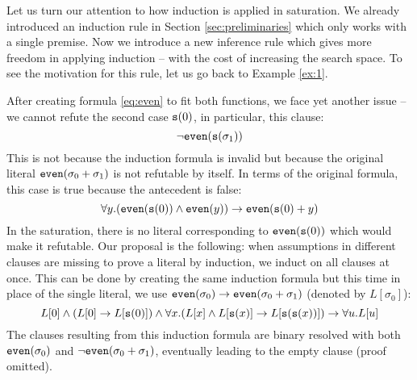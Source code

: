 
Let us turn our attention to how induction is applied in saturation. We already introduced an induction rule in Section \ref{sec:preliminaries} which only works with a single premise. Now we introduce a new inference rule which gives more freedom in applying induction -- with the cost of increasing the search space. To see the motivation for this rule, let us go back to Example \ref{ex:1}.

After creating formula \eqref{eq:even} to fit both functions, we face yet another issue -- we cannot refute the second case $\mathtt{s}(0)$, in particular, this clause:
$$\neg\mathtt{even}(\mathtt{s}(\sigma_1))$$
This is not because the induction formula is invalid but because the original literal $\mathtt{even}(\sigma_0+\sigma_1)$ is not refutable by itself. In terms of the original formula, this case is true because the antecedent is false:
$$\forall y. (\mathtt{even}(\mathtt{s}(0))\land\mathtt{even}(y))\rightarrow\mathtt{even}(\mathtt{s}(0)+y)$$
In the saturation, there is no literal corresponding to $\mathtt{even}(\mathtt{s}(0))$ which would make it refutable. Our proposal is the following: when assumptions in different clauses are missing to prove a literal by induction, we induct on all clauses at once. This can be done by creating the same induction formula but this time in place of the single literal, we use $\mathtt{even}(\sigma_0)\rightarrow\mathtt{even}(\sigma_0+\sigma_1)$ (denoted by $L[\sigma_0]$):
$$L[0]\land(L[0]\rightarrow L[\mathtt{s}(0)])\land\forall x.(L[x]\land L[\mathtt{s}(x)]\rightarrow L[\mathtt{s}(\mathtt{s}(x))])\rightarrow \forall u.L[u]$$
The clauses resulting from this induction formula are binary resolved with both $\mathtt{even}(\sigma_0)$ and $\neg\mathtt{even}(\sigma_0+\sigma_1)$, eventually leading to the empty clause (proof omitted).
